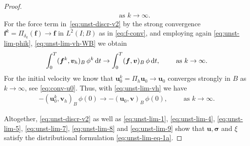 \documentclass[reqno,a4paper]{amsart}
\def\vec#1{\boldsymbol{#1}}
\def\d{{\rm d}}
\def\dt{\,\d t}
\def\bf{\vec{f}}
\def\bu{\vec{u}}
\def\bv{\vec{v}}
\def\bsigma{\vec{\sigma}}
\begin{document}
\begin{proof}
\begin{align}
		\qquad \text{ as } k \to \infty.  
	\end{align}
	For the force term in~\eqref{eq:unst-discr-v2} by the strong convergence $ \bf^k = \Pi_{\delta_k}(
	\bf)  \to  \bf $  in $L^2(I;B)$ as in  \eqref{eq:f-conv}, and employing again \eqref{eq:unst-lim-phik}, \eqref{eq:unst-lim-vh-WB} we obtain 
	\begin{align}\label{eq:unst-lim-8}
		\int_0^T ( \bf^k  ,{\bv}_h)_B \,\phi^k \dt 
		\to  
		\int_0^T ( \bf  ,{\bv})_B \,\phi \dt,
		\qquad  \text{ as } k \to \infty. 
	\end{align}
	For the initial velocity we know that  $\bu^k_0 =  \Pi_h  \bu_0 \to  \bu_0$ converges strongly in $B$ as $k \to \infty$, see \eqref{eq:conv-u0}. 
	Thus, with \eqref{eq:unst-lim-vh} we have 
	\begin{align}\label{eq:unst-lim-9}
		- ( \bu^k_0,  \bv_h)_B\,\phi(0) 
		\to 
		- ( \bu_0,  \bv)_B\,\phi(0), 
		\qquad  \text{ as } k \to \infty. 
	\end{align}
	
	Altogether, \eqref{eq:unst-discr-v2} as well as 
	\eqref{eq:unst-lim-1}, 
	\eqref{eq:unst-lim-4}, \eqref{eq:unst-lim-5}, \eqref{eq:unst-lim-7}, \eqref{eq:unst-lim-8} and \eqref{eq:unst-lim-9} show that $\bu, \bsigma$ and $\xi$ satisfy the distributional formulation \eqref{eq:unst-lim-eq-1a}. 
	

\end{proof}
\end{document}
